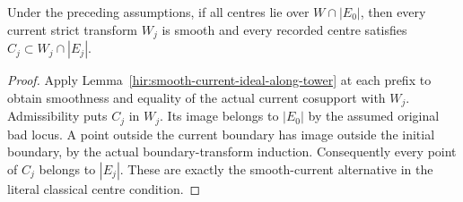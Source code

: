 \begin{theorem}
\label{hir:smooth-current-centres-in-boundary}
\leanok
Under the preceding assumptions, if all centres lie over $W\cap|E_0|$,
then every current strict transform $W_j$ is smooth and every recorded
centre satisfies $C_j\subset W_j\cap|E_j|$.
\end{theorem}
\begin{proof}
Apply Lemma~\ref{hir:smooth-current-ideal-along-tower} at each prefix to
obtain smoothness and equality of the actual current cosupport with $W_j$.
Admissibility puts $C_j$ in $W_j$. Its image belongs to $|E_0|$ by the
assumed original bad locus. A point outside the current boundary has image
outside the initial boundary, by the actual boundary-transform induction.
Consequently every point of $C_j$ belongs to $|E_j|$. These are exactly the
smooth-current alternative in the literal classical centre condition.
\end{proof}

